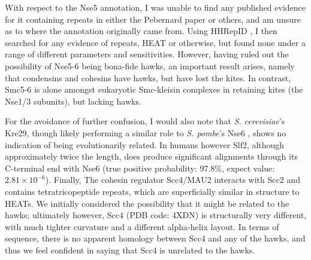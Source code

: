 \documentclass[a4paper,11pt,twoside,openright]{scrbook}
\begin{document}
With respect to the Nse5 annotation, I was unable to find any published evidence
for it containing repeats in either the Pebernard paper or others, and am unsure
as to where the annotation originally came from. Using HHRepID
\cite{Biegert2008}, I then searched for any evidence of repeats, HEAT or
otherwise, but found none under a range of different parameters and
sensitivities. However, having ruled out the possibility of Nse5-6 being
bona-fide hawks, an important result arises, namely that condensins and cohesins
have hawks, but have lost the kites. In contrast, Smc5-6 is alone amongst
eukaryotic Smc-kleisin complexes in retaining kites (the Nse1/3 subunits), but
lacking hawks.

For the avoidance of further confusion, I would also note that \textit{S.
cerevisiae}'s Kre29, though likely performing a similar role to \textit{S.
pombe}’s Nse6 \cite{Duan2009}, shows no indication of being evolutionarily
related. In humans however Slf2, although approximately twice the length, does
produce significant alignments through its C-terminal end with Nse6 (true
positive probability: 97.8\%, expect value: $2.81\times10^{-6}$). Finally, The
cohesin regulator Scc4/MAU2 interacts with Scc2 and contains tetratricopeptide
repeats, which are superficially similar in structure to HEATs. We initially
considered the possibility that it might be related to the hawks; ultimately
however, Scc4 (PDB code: 4XDN) is structurally very different, with much tighter
curvature and a different alpha-helix layout. In terms of sequence, there is no
apparent homology between Scc4 and any of the hawks, and thus we feel confident
in saying that Scc4 is unrelated to the hawks.
\end{document}
